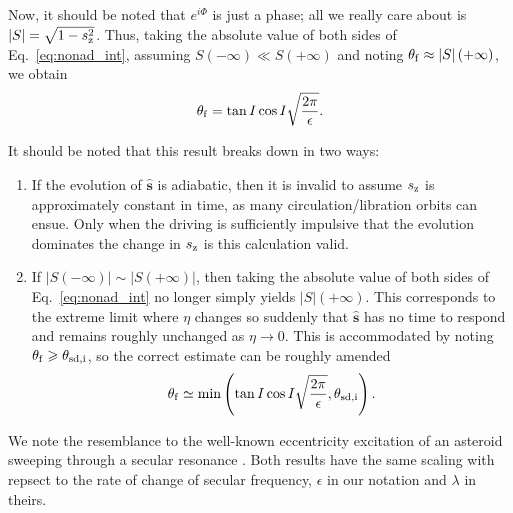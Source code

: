 \documentclass[
        fleqn,
        usenatbib,
    ]{mnras}
\newcommand*{\abs}[1]{\left|#1\right|}
\newcommand*{\bm}[1]{\boldsymbol{\mathbf{#1}}}
\newcommand*{\uv}[1]{\hat{\bm{#1}}}
\newcommand*{\p}[1]{\left(#1\right)}
\begin{document}
Now, it should be noted that $e^{i\Phi}$ is just a phase; all we really care
about is $\abs{S} = \sqrt{1 - s_{\rm z}^2}$. Thus, taking the absolute value of both
sides of Eq.~\eqref{eq:nonad_int}, assuming $S\p{-\infty} \ll S\p{+\infty}$ and
noting $\theta_{\rm f} \approx \abs{S}(+\infty)$, we obtain
\begin{equation}
    \theta_{\rm f} = \tan I\cos I\sqrt{\frac{2\pi}{\epsilon}}.
        \label{eq:nonad_dong}
\end{equation}

It should be noted that this result breaks down in two ways:
\begin{enumerate}
    \item If the evolution of $\uv{s}$ is adiabatic, then it is invalid to
        assume $s_{\rm z}$ is approximately constant in time, as many
        circulation/libration orbits can ensue. Only when the driving is
        sufficiently impulsive that the evolution dominates the change in
        $s_{\rm z}$
        is this calculation valid.

    \item If $\abs{S\p{-\infty}} \sim \abs{S\p{+\infty}}$, then taking the
        absolute value of both sides of Eq.~\eqref{eq:nonad_int} no longer
        simply yields $\abs{S}\p{+\infty}$. This corresponds to the extreme
        limit where $\eta$ changes so suddenly that $\uv{s}$ has no time to
        respond and remains roughly unchanged as $\eta \to 0$. This is
        accommodated by noting $\theta_{\rm f} \geq \theta_{\rm sd, i}$, so the
        correct estimate can be roughly amended
        \begin{equation}
            \theta_{\rm f} \simeq \min\p{\tan I\cos
                I\sqrt{\frac{2\pi}{\epsilon}}, \theta_{\rm sd, i}}.
        \end{equation}
\end{enumerate}

We note the resemblance to the well-known eccentricity excitation of an asteroid
sweeping through a secular resonance \citep{malhotra_calc}. Both results have
the same scaling with repsect to the rate of change of secular frequency,
$\epsilon$ in our notation and $\lambda$ in theirs.

\bsp
\label{lastpage} %
\end{document}
